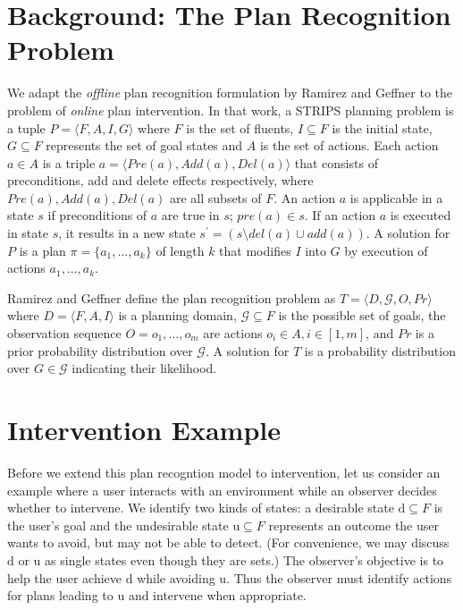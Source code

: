 \documentclass[letterpaper]{article}
\theoremstyle{plain}
\begin{document}
\section{Background: The Plan Recognition Problem}
\label{sec:prp}
We adapt the \emph{offline} plan recognition formulation by Ramirez and Geffner  to the problem of \emph{online} plan intervention.
In that work, a STRIPS \cite{fikes1971strips} planning problem is a tuple $ P = \langle F, A, I, G \rangle$ where $F$ is the set of fluents, $I\subseteq F$ is the initial state, $G  \subseteq F$ represents the set of goal states and $A$ is the set of actions. 
Each action $a \in A$ is a triple $a=\langle Pre(a), Add(a), Del(a)\rangle$ that consists of preconditions, add and delete effects respectively, where $Pre(a), Add(a), Del(a)$ are all subsets of $F$. 
An action $a$ is applicable in a state $s$ if preconditions of $a$ are true in $s$; $pre(a) \in s$. 
If an action $a$ is executed in state $s$, it results in a new state $s^{\prime} = (s \setminus del(a) \cup add(a))$.  
A solution for $P$ is a plan $\pi = \{a_1, \dots ,a_k\}$ of length $k$ that modifies $I$ into $G$ by execution of actions $a_1, \dots ,a_k$.

Ramirez and Geffner  define the plan recognition problem as $T= \langle D, \mathcal{G}, O, Pr \rangle$ where $D=\langle F, A, I \rangle$ is a planning domain, $\mathcal{G} \subseteq F$ is the possible set of goals, the observation sequence $O = o_1, \ldots , o_m$ are actions $o_i \in A, i \in[1,m]$, and $Pr$ is a prior probability distribution over $\mathcal{G}$. A solution for $T$ is a probability distribution over $G \in \mathcal{G}$ indicating their likelihood. 



\section{Intervention Example}

Before we extend this plan recogntion model to intervention, let us consider an example where a user interacts with an environment while an observer decides whether to intervene.
We identify two kinds of states:  a desirable state $\mathrm{d} \subseteq F$ is the user's goal and the undesirable state $\mathrm{u} \subseteq F$ represents an outcome the user wants to avoid, but may not be able to detect.
(For convenience, we may discuss $\mathrm{d}$ or $\mathrm{u}$ as single states even though they are sets.)
The observer's objective is to help the user achieve $\mathrm{d}$ while avoiding $\mathrm{u}$.
Thus the observer must identify actions for plans leading to $\mathrm{u}$ and intervene when appropriate.
\end{document}
